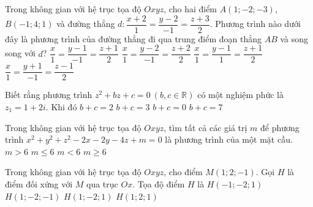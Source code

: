 \begin{ex}%
Trong không gian với hệ trục tọa độ $Oxyz$, cho hai điểm $A(1;-2;-3)$, $B(-1;4;1)$ và đường thẳng $d\colon \dfrac{x+2}{1}=\dfrac{y-2}{-1}=\dfrac{z+3}{2}$. Phương trình nào dưới đây là phương trình của đường thẳng đi qua trung điểm đoạn thẳng $AB$ và song song với $d$?
\choice
{\True $\dfrac{x}{1}=\dfrac{y-1}{-1}=\dfrac{z+1}{2}$}
{$\dfrac{x}{1}=\dfrac{y-2}{-1}=\dfrac{z+2}{2}$}
{$\dfrac{x}{1}=\dfrac{y-1}{1}=\dfrac{z+1}{2}$}
{$\dfrac{x}{1}=\dfrac{y+1}{-1}=\dfrac{z-1}{2}$}
\end{ex}

\begin{ex}%
Biết rằng phương trình $z^2+bz+c=0\ (b,c\in\mathbb R)$ có một nghiệm phức là $z_1=1+2i$. Khi đó
\choice
{$b+c=2$}
{\True $b+c=3$}
{$b+c=0$}
{$b+c=7$}
\end{ex}

\begin{ex}%
Trong không gian với hệ trục tọa độ $Oxyz$, tìm tất cả các giá trị $m$ để phương trình $x^2+y^2+z^2-2x-2y-4z+m=0$ là phương trình của một mặt cầu.
\choice
{$m>6$}
{$m\le6$}
{\True $m<6$}
{$m\ge6$}
\end{ex}

\begin{ex}%
Trong không gian với hệ trục tọa độ $Oxyz$, cho điểm $M(1;2;-1)$. Gọi $H$ là điểm đối xứng với $M$ qua trục $Ox$. Tọa độ điểm $H$ là
\choice
{$H(-1;-2;1)$}
{$H(1;-2;-1)$}
{\True $H(1;-2;1)$}
{$H(1;2;1)$}
\end{ex}

